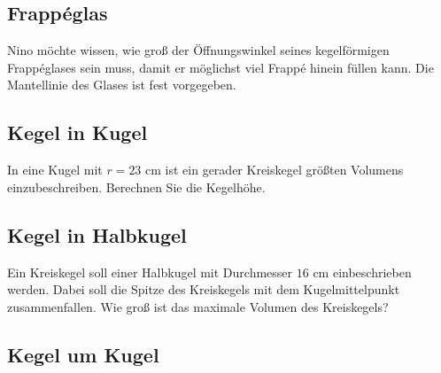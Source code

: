 
\subsection{Frappéglas}

Nino möchte wissen, wie groß der Öffnungswinkel seines kegelförmigen
Frappéglases sein muss, damit er möglichst viel Frappé hinein füllen
kann. Die Mantellinie des Glases ist fest vorgegeben.



\subsection{Kegel in Kugel}
In eine Kugel mit $r = 23 \text{ cm}$ ist ein gerader Kreiskegel größten Volumens einzubeschreiben. Berechnen Sie die Kegelhöhe.


\subsection{Kegel in Halbkugel}
Ein Kreiskegel soll einer Halbkugel mit Durchmesser $16 \text{ cm}$
einbeschrieben werden. Dabei soll die Spitze des Kreiskegels mit dem
Kugelmittelpunkt zusammenfallen. Wie groß ist das maximale Volumen des
Kreiskegels?




\subsection{Kegel um Kugel}

